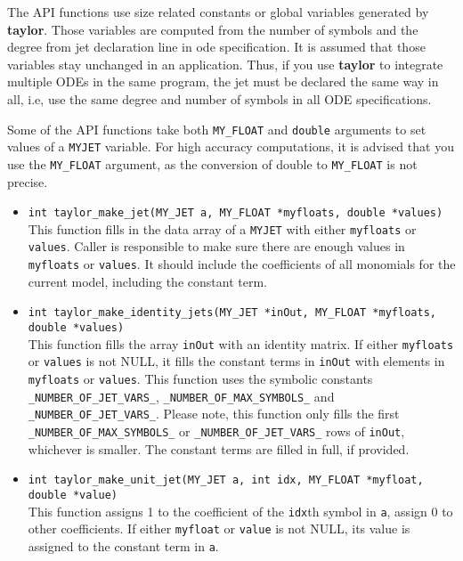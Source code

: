 \documentclass[10pt]{article}
\theoremstyle{remark}
\newcommand{\taylorname}{{\bf taylor}}
\newcommand{\myjet}{{\tt MY\symbol{95}JET}}
\begin{document}
\bigskip
The API functions use size related constants or global variables
generated by \taylorname{}. Those variables are computed from the
number of symbols and the degree from jet declaration line in ode
specification.  It is assumed that those variables stay unchanged in
an application. Thus, if you use \taylorname{} to integrate multiple
ODEs in the same program, the jet must be declared the same way in
all, i.e, use the same degree and number of symbols in all ODE
specifications.

\bigskip
Some of the API functions take both \verb+MY_FLOAT+ and \verb+double+
arguments to set values of a \myjet{} variable.  For high accuracy
computations, it is advised that you use the \verb+MY_FLOAT+ argument,
as the conversion of double to \verb+MY_FLOAT+ is not precise.

\begin{itemize}
\item {\verb+int taylor_make_jet(MY_JET a, MY_FLOAT *myfloats, double *values)+  \\  
    This function fills in the data array of a \myjet{} with either
    \verb+myfloats+ or \verb+values+. Caller is responsible to make
    sure there are enough values in \verb+myfloats+ or
    \verb+values+. It should include the coefficients of all monomials
    for the current model, including the constant term.}
    
\item{\verb+int taylor_make_identity_jets(MY_JET *inOut, MY_FLOAT *myfloats, double *values)+ \\
    This function fills the array \verb+inOut+ with an identity
    matrix. If either \verb+myfloats+ or \verb+values+ is not NULL, it
    fills the constant terms in \verb+inOut+ with elements in
    \verb+myfloats+ or \verb+values+.  This function uses the symbolic
    constants \verb+_NUMBER_OF_JET_VARS_+, \verb+_NUMBER_OF_MAX_SYMBOLS_+
    and \verb+_NUMBER_OF_JET_VARS_+.  Please note, this function
    only fills the first \verb+_NUMBER_OF_MAX_SYMBOLS_+ or
    \verb+_NUMBER_OF_JET_VARS_+ rows of \verb+inOut+, whichever is
    smaller. The constant terms are filled in full, if provided.}
    
\item{\verb+int taylor_make_unit_jet(MY_JET a, int idx, MY_FLOAT *myfloat, double *value)+\\
    This function assigns 1 to the coefficient of the \verb+idx+th
    symbol in \verb+a+, assign 0 to other coefficients. If either
    \verb+myfloat+ or \verb+value+ is not NULL, its value is assigned
    to the constant term in \verb+a+.  }
    

\end{itemize}
\end{document}
